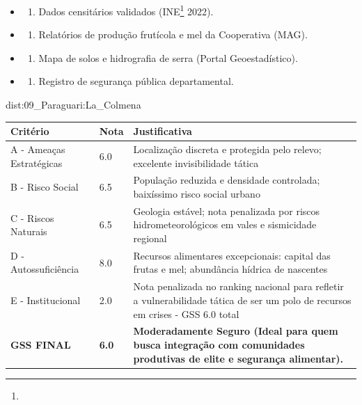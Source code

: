{\begin{itemize}
\tightlist
\item
  \begin{enumerate}
  \def\labelenumi{\arabic{enumi})}
  \tightlist
  \item
    Dados censitários validados (INE\footnote{\fineINE} 2022).
  \end{enumerate}
\item
  \begin{enumerate}
  \def\labelenumi{\arabic{enumi})}
  \setcounter{enumi}{1}
  \tightlist
  \item
    Relatórios de produção frutícola e mel da Cooperativa (MAG).
  \end{enumerate}
\item
  \begin{enumerate}
  \def\labelenumi{\arabic{enumi})}
  \setcounter{enumi}{2}
  \tightlist
  \item
    Mapa de solos e hidrografia de serra (Portal Geoestadístico).
  \end{enumerate}
\item
  \begin{enumerate}
  \def\labelenumi{\arabic{enumi})}
  \setcounter{enumi}{3}
  \tightlist
  \item
    Registro de segurança pública departamental.
  \end{enumerate}
\end{itemize}}{dist:09_Paraguari:La_Colmena}
\begin{table}[ht!]
\small \begin{tabular}{p{3.0cm}p{0.8cm}p{6.0cm}} \toprule
\textbf{Critério} & \textbf{Nota} & \textbf{Justificativa} \\ \midrule
A - Ameaças Estratégicas & 6.0 & Localização discreta e protegida pelo relevo; excelente invisibilidade tática \\
B - Risco Social & 6.5 & População reduzida e densidade controlada; baixíssimo risco social urbano \\
C - Riscos Naturais & 6.5 & Geologia estável; nota penalizada por riscos hidrometeorológicos em vales e sismicidade regional \\
D - Autossuficiência & 8.0 & Recursos alimentares excepcionais: capital das frutas e mel; abundância hídrica de nascentes \\
E - Institucional & 2.0 & Nota penalizada no ranking nacional para refletir a vulnerabilidade tática de ser um polo de recursos em crises - GSS 6.0 total \\
\midrule \textbf{GSS FINAL} & \textbf{6.0} & \textbf{Moderadamente Seguro (Ideal para quem busca integração com comunidades produtivas de elite e segurança alimentar).} \\ \bottomrule \end{tabular}
\end{table}
